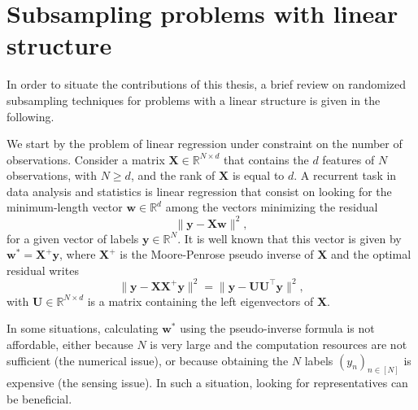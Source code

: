 \documentclass[twoside,11pt]{book}
\numberwithin{theorem}{chapter}
\numberwithin{definition}{chapter}
\numberwithin{proposition}{chapter}
\numberwithin{corollary}{chapter}
\numberwithin{example}{chapter}
\numberwithin{lemma}{chapter}
\numberwithin{assumption}{chapter}
\numberwithin{equation}{chapter}
\numberwithin{figure}{chapter}
\DeclareMathOperator{\Tran}{\intercal}
\begin{document}
\section{Subsampling problems with linear structure}

In order to situate the contributions of this thesis, a brief review on randomized subsampling techniques for problems with a linear structure is given in the following. 

We start by the problem of linear regression under constraint on the number of observations. Consider a matrix $\bm{X}\in \mathbb{R}^{N \times d}$ that contains the $d$ features of $N$ observations, with $N \geq d$, and the rank of $\bm{X}$ is equal to $d$. A recurrent task in data analysis and statistics is linear regression that consist on looking for the minimum-length vector $\bm{w} \in \mathbb{R}^{d}$ among the vectors minimizing the residual
\begin{equation}
\|\bm{y} - \bm{X}\bm{w}\|^{2},
\end{equation}
for a given vector of labels $\bm{y} \in \mathbb{R}^{N}$. It is well known that this vector is given by $\bm{w}^{*} = \bm{X}^{+}\bm{y}$, where $\bm{X}^{+}$ is the Moore-Penrose pseudo inverse of $\bm{X}$
and the optimal  residual writes
\begin{equation}
\|\bm{y} - \bm{X}\bm{X}^{+}\bm{y}\|^{2} = \|\bm{y} - \bm{U}\bm{U}^{\Tran}\bm{y}\|^{2},
\end{equation}
with $\bm{U} \in \mathbb{R}^{N \times d}$ is a matrix containing the left eigenvectors of $\bm{X}$.

In some situations, calculating $\bm{w}^{*}$ using the pseudo-inverse formula is not affordable, either because $N$ is very large and the computation resources are not sufficient (the numerical issue), or because obtaining the $N$ labels $(y_{n})_{n \in [N]}$ is expensive (the sensing issue). In such a situation, looking for representatives can be beneficial.
\end{document}
